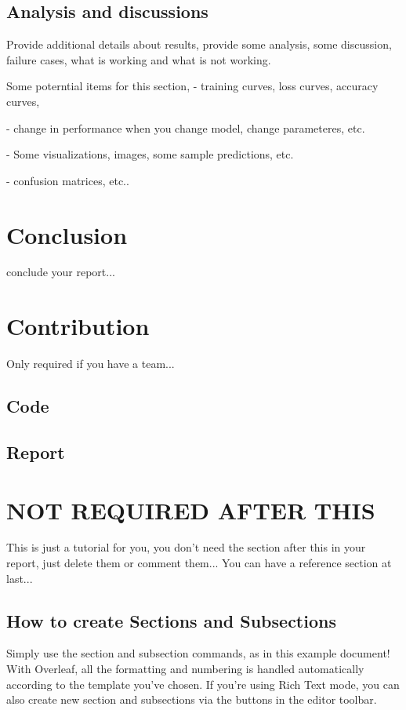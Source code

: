 \documentclass{article}
\begin{document}
\subsection{Analysis and discussions}

Provide additional details about results, provide some analysis, some discussion, failure cases, what is working and what is not working.

Some poterntial items for this section,
- training curves, loss curves, accuracy curves, 

- change in performance when you change model, change parameteres, etc. 

- Some visualizations, images, some sample predictions, etc. 

- confusion matrices, etc..

\section{Conclusion}
conclude your report...

\section{Contribution}
Only required if you have a team...

\subsection{Code}

\subsection{Report}

\section{NOT REQUIRED AFTER THIS}
This is just a tutorial for you, you don't need the section after this in your report, just delete them or comment them... You can have a reference section at last...

\subsection{How to create Sections and Subsections}

Simply use the section and subsection commands, as in this example document! With Overleaf, all the formatting and numbering is handled automatically according to the template you've chosen. If you're using Rich Text mode, you can also create new section and subsections via the buttons in the editor toolbar.
\end{document}

